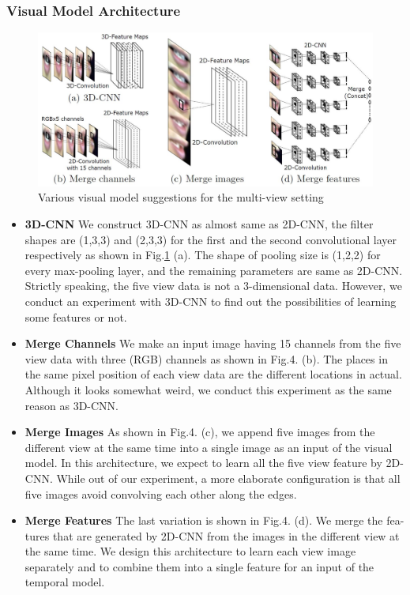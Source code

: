 \subsubsection{Visual Model Architecture}
\begin{figure}[h]
	\centering
	\includegraphics[width=\columnwidth]{fig/multi.jpg}
	\caption{Various visual model suggestions for the multi-view setting}
	\label{fig:multi}
\end{figure}
\begin{itemize}
	\item \textbf{3D-CNN}
	We construct 3D-CNN as almost same as 2D-CNN, the filter shapes are
	(1,3,3) and (2,3,3) for the first and the second convolutional layer respectively as shown in Fig.\ref{fig:multi} (a). The shape of pooling size is (1,2,2) for every max-pooling layer, and the remaining parameters are same as 2D-CNN. Strictly speaking, the five view data is not a 3-dimensional data. However, we conduct an experiment with 3D-CNN to find out the possibilities of learning some features or not.
	\item \textbf{Merge Channels}
	We make an input image having 15 channels from the five view data with three (RGB) channels as shown in Fig.4. (b). The places in the same pixel position of each view data are the different locations in actual. Although it looks somewhat weird, we conduct this experiment as the same reason as 3D-CNN.
	\item \textbf{Merge Images}
	As shown in Fig.4. (c), we append five images from the different view at the same time into a single image as an input of the visual model. In this architecture, we expect to learn all the five view feature by 2D-CNN. While out of our experiment, a more elaborate configuration is that all five images avoid convolving each other along the edges.
	\item \textbf{Merge Features}
	The last variation is shown in Fig.4. (d). We merge the fea- tures that are generated by 2D-CNN from the images in the different view at the same time. We design this architecture to learn each view image separately and to combine them into a single feature for an input of the temporal model.
\end{itemize}

